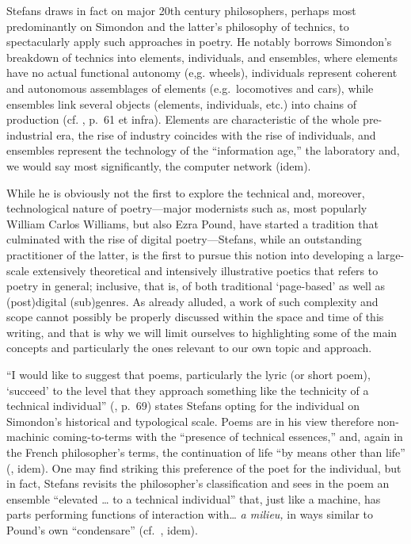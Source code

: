Stefans draws in fact on major 20th century philosophers, perhaps most
predominantly on Simondon and the latter's philosophy of technics, to
spectacularly apply such approaches in poetry. He notably borrows
Simondon's breakdown of technics into elements, individuals, and
ensembles, where elements have no actual functional autonomy (e,g.
wheels), individuals represent coherent and autonomous assemblages of
elements (e.g.~locomotives and cars), while ensembles link several
objects (elements, individuals, etc.) into chains of production (cf.
\cite{stefans2017word}, p.~61 et infra). Elements are characteristic of
the whole pre-industrial era, the rise of industry coincides with the
rise of individuals, and ensembles represent the technology of the
``information age,'' the laboratory and, we would say most
significantly, the computer network (idem).

While he is obviously not the first to explore the technical and,
moreover, technological nature of poetry---major modernists such as,
most popularly William Carlos Williams, but also Ezra Pound, have
started a tradition that culminated with the rise of digital
poetry---Stefans, while an outstanding practitioner of the latter, is
the first to pursue this notion into developing a large-scale
extensively theoretical and intensively illustrative poetics that refers
to poetry in general; inclusive, that is, of both traditional
`page-based' as well as (post)digital (sub)genres. As already alluded, a
work of such complexity and scope cannot possibly be properly discussed
within the space and time of this writing, and that is why we will limit
ourselves to highlighting some of the main concepts and particularly the
ones relevant to our own topic and approach.

``I would like to suggest that poems, particularly the lyric (or short
poem), `succeed' to the level that they approach something like the
technicity of a technical individual'' (\cite{stefans2017word}, p.~69)
states Stefans opting for the individual on Simondon's historical and
typological scale. Poems are in his view therefore non-machinic
coming-to-terms with the ``presence of technical essences,'' and, again
in the French philosopher's terms, the continuation of life ``by means
other than life'' (\cite{stefans2017word}, idem). One may find striking
this preference of the poet for the individual, but in fact, Stefans
revisits the philosopher's classification and sees in the poem an
ensemble ``elevated {\ldots} to a technical individual'' that, just
like a machine, has parts performing functions of interaction
with\ldots{} \emph{a milieu,} in ways similar to Pound's own
``condensare'' (cf.~\cite{stefans2017word}, idem).


